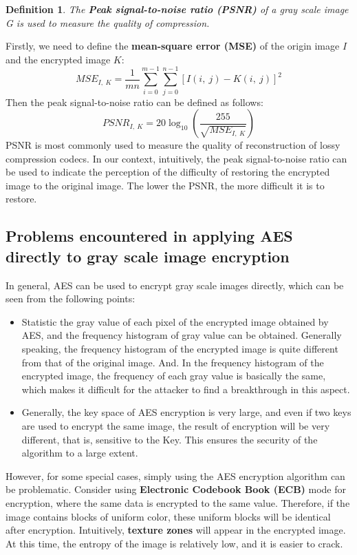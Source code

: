 \documentclass[11pt]{article}
\newtheorem{definition}[theorem]{Definition}
\begin{document}
\begin{definition}
The \textbf{Peak signal-to-noise ratio (PSNR)} of a gray scale image G is used to measure the quality of compression.
\end{definition}

Firstly, we need to define the \textbf{mean-square error (MSE)} of the origin image $I$ and the encrypted image $K$:
$$
MSE_{I,\ K}=\frac{1}{mn}\sum_{i=0}^{m-1}\sum_{j=0}^{n-1}[I(i,\ j)-K(i,\ j)]^2
$$
Then the peak signal-to-noise ratio can be defined as follows:
$$
PSNR_{I,\ K}=20\log_{10}(\frac{255}{\sqrt{MSE_{{I,\ K}}}})
$$
PSNR is most commonly used to measure the quality of reconstruction of lossy compression codecs. In our context, intuitively, the peak signal-to-noise ratio can be used to indicate the perception of the difficulty of restoring the encrypted image to the original image. The lower the PSNR, the more difficult it is to restore.

\subsection{Problems encountered in applying AES directly to gray scale image encryption}
In general, AES can be used to encrypt gray scale images directly, which can be seen from the following points:
\begin{itemize}
\item Statistic the gray value of each pixel of the encrypted image obtained by AES, and the frequency histogram of gray value can be obtained. Generally speaking, the frequency histogram of the encrypted image is quite different from that of the original image. And. In the frequency histogram of the encrypted image, the frequency of each gray value is basically the same, which makes it difficult for the attacker to find a breakthrough in this aspect.
\item Generally, the key space of AES encryption is very large, and even if two keys are used to encrypt the same image, the result of encryption will be very different, that is, sensitive to the Key. This ensures the security of the algorithm to a large extent.
\end{itemize}
However, for some special cases, simply using the AES encryption algorithm can be problematic. Consider using \textbf{Electronic Codebook Book (ECB)} mode for encryption, where the same data is encrypted to the same value. Therefore, if the image contains blocks of uniform color, these uniform blocks will be identical after encryption. Intuitively, \textbf{texture zones} will appear in the encrypted image. At this time, the entropy of the image is relatively low, and it is easier to crack.
\end{document}
